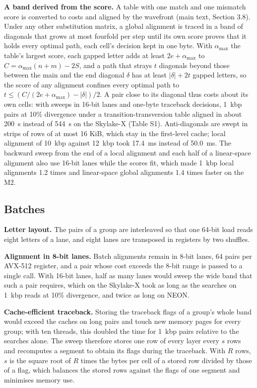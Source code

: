 \documentclass[10pt]{article}
\begin{document}
\textbf{A band derived from the score.} A table with one match and one mismatch score is converted to costs and aligned by the wavefront (main text, Section 3.8). Under any other substitution matrix, a global alignment is traced in a band of diagonals that grows at most fourfold per step until its own score proves that it holds every optimal path, each cell's decision kept in one byte. With \(\alpha_{\max}\) the table's largest score, each gapped letter adds at least \(2e+\alpha_{\max}\) to \(C = \alpha_{\max}(n+m) - 2S\), and a path that strays \(t\) diagonals beyond those between the main and the end diagonal \(\delta\) has at least \(|\delta| + 2t\) gapped letters, so the score of any alignment confines every optimal path to \(t \le (C/(2e+\alpha_{\max}) - |\delta|)/2\). A pair close to its diagonal thus costs about its own cells: with sweeps in 16-bit lanes and one-byte traceback decisions, 1~kbp pairs at 10\% divergence under a transition-transversion table aligned in about 200~\textmu s instead of 544~\textmu s on the Skylake-X (Table S1). Anti-diagonals are swept in strips of rows of at most 16 KiB, which stay in the first-level cache; local alignment of 10~kbp against 12~kbp took 17.4~ms instead of 50.0~ms. The backward sweep from the end of a local alignment and each half of a linear-space alignment also use 16-bit lanes while the scores fit, which made 1~kbp local alignments 1.2 times and linear-space global alignments 1.4 times faster on the M2.

\subsection{Batches}

\textbf{Letter layout.} The pairs of a group are interleaved so that one 64-bit load reads eight letters of a lane, and eight lanes are transposed in registers by two shuffles.

\textbf{Alignment in 8-bit lanes.} Batch alignments remain in 8-bit lanes, 64 pairs per AVX-512 register, and a pair whose cost exceeds the 8-bit range is passed to a single call. With 16-bit lanes, half as many lanes would sweep the wide band that such a pair requires, which on the Skylake-X took as long as the searches on 1~kbp reads at 10\% divergence, and twice as long on NEON.

\textbf{Cache-efficient traceback.} Storing the traceback flags of a group's whole band would exceed the caches on long pairs and touch new memory pages for every group; with ten threads, this doubled the time for 1~kbp pairs relative to the searches alone. The sweep therefore stores one row of every layer every \(s\) rows and recomputes a segment to obtain its flags during the traceback. With \(R\) rows, \(s\) is the square root of \(R\) times the bytes per cell of a stored row divided by those of a flag, which balances the stored rows against the flags of one segment and minimises memory use.
\end{document}
